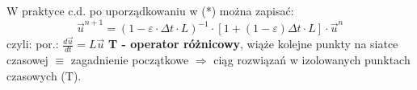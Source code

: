 \begin{frame}{W praktyce c.d.}
  po uporządkowaniu w (*) można zapisać:
  $${\vec{u}}^{n+1} = (1-\varepsilon\cdot\Delta t\cdot L)^{-1}\cdot[1+(1-\varepsilon)\Delta t\cdot L]\cdot \vec{u}^n $$
  czyli:  \qquad por.: $\frac{d\vec{u}}{dt} = L\vec{u}$\newline\newline\newline
  \textbf{T - operator różnicowy}, wiąże kolejne punkty na siatce czasowej $\equiv$ zagadnienie początkowe $\Rightarrow$ ciąg rozwiązań w izolowanych punktach czasowych (T).
\end{frame}
